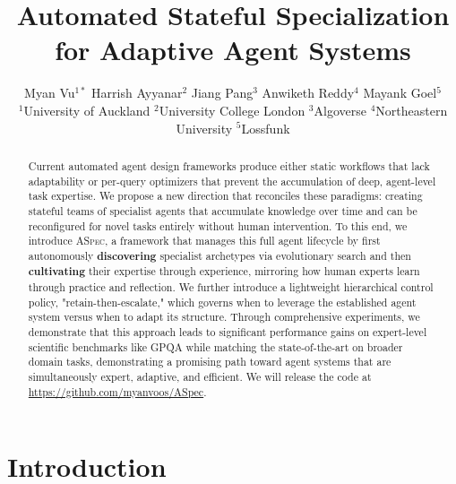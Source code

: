 \documentclass{article} %
\title{Automated Stateful Specialization \\ for Adaptive Agent Systems}
\author{%
  Myan Vu$^{1*}$ \quad
  Harrish Ayyanar$^{2}$ \quad
  Jiang Pang$^{3}$ \quad
  Anwiketh Reddy$^{4}$ \quad
  Mayank Goel$^{5}$ \\[0.3em]
  \small $^1$University of Auckland \quad
  $^2$University College London \quad
  $^3$Algoverse \quad
  $^4$Northeastern University \quad
  $^5$Lossfunk
}
\begin{document}
\maketitle
{}
\begin{abstract}

Current automated agent design frameworks produce either static workflows that lack adaptability or per-query optimizers that prevent the accumulation of deep, agent-level task expertise. We propose a new direction that reconciles these paradigms: creating stateful teams of specialist agents that accumulate knowledge over time and can be reconfigured for novel tasks entirely without human intervention. To this end, we introduce \textsc{ASpec}, a framework that manages this full agent lifecycle by first autonomously \textbf{discovering} specialist archetypes via evolutionary search and then \textbf{cultivating} their expertise through experience, mirroring how human experts learn through practice and reflection. We further introduce a lightweight hierarchical control policy, "retain-then-escalate," which governs when to leverage the established agent system versus when to adapt its structure. Through comprehensive experiments, we demonstrate that this approach leads to significant performance gains on expert-level scientific benchmarks like GPQA while matching the state-of-the-art on broader domain tasks, demonstrating a promising path toward agent systems that are simultaneously expert, adaptive, and efficient. We will release the code at \href{https://github.com/myanvoos/ASpec}{https://github.com/myanvoos/ASpec}.

\end{abstract}


\section{Introduction}
\end{document}
